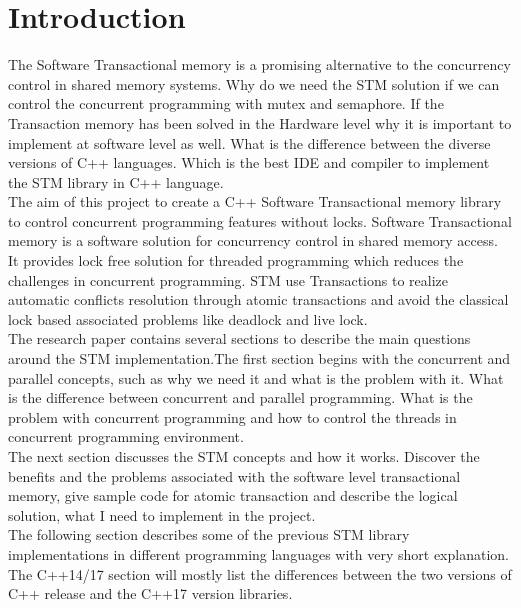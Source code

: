 \documentclass[12pt]{article}
\begin{document}
\section{Introduction}
The Software Transactional memory is a promising alternative to the concurrency control in shared memory systems. Why do we need the STM solution if we can control the concurrent programming with mutex and semaphore. If the Transaction memory has been solved in the Hardware level why it is important to implement at software level as well. What is the difference between the diverse versions of C++ languages. Which is the best IDE and compiler to implement the STM library in C++ language.\\

The aim of this project to create a C++ Software Transactional memory library to control concurrent programming features without locks. Software Transactional memory is a software solution for concurrency control in shared memory access. It provides lock free solution for threaded programming which reduces the challenges in concurrent programming. STM use Transactions to realize automatic conflicts resolution through atomic transactions and avoid the classical lock based associated problems like deadlock and live lock.\\

The research paper contains several sections to describe the main questions around the STM implementation.The first section begins with the concurrent and parallel concepts, such as why we need it and what is the problem with it. What is the difference between concurrent and parallel programming. What is the problem with concurrent programming and how to control the threads in concurrent programming environment.\\

The next section discusses the STM concepts and how it works. Discover the benefits and the problems associated with the software level transactional memory, give sample code for atomic transaction and describe the logical solution, what I need to implement in the project.\\

The following section describes some of the previous STM library implementations in different programming languages with very short explanation.\\

The C++14/17 section will mostly list the differences between the two versions of C++ release and the C++17 version libraries.\\
\end{document}
